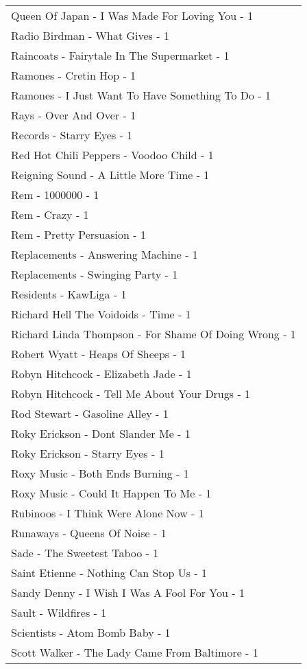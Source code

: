\documentclass[
]{article}
\begin{document}
\begin{longtable}{l}
Queen Of Japan - I Was Made For Loving You - 1 \\ 
Radio Birdman - What Gives - 1 \\ 
Raincoats - Fairytale In The Supermarket - 1 \\ 
Ramones - Cretin Hop - 1 \\ 
Ramones - I Just Want To Have Something To Do - 1 \\ 
Rays - Over And Over - 1 \\ 
Records - Starry Eyes - 1 \\ 
Red Hot Chili Peppers - Voodoo Child - 1 \\ 
Reigning Sound - A Little More Time - 1 \\ 
Rem - 1000000 - 1 \\ 
Rem - Crazy - 1 \\ 
Rem - Pretty Persuasion - 1 \\ 
Replacements - Answering Machine - 1 \\ 
Replacements - Swinging Party - 1 \\ 
Residents - KawLiga - 1 \\ 
Richard Hell The Voidoids - Time - 1 \\ 
Richard Linda Thompson - For Shame Of Doing Wrong - 1 \\ 
Robert Wyatt - Heaps Of Sheeps - 1 \\ 
Robyn Hitchcock - Elizabeth Jade - 1 \\ 
Robyn Hitchcock - Tell Me About Your Drugs - 1 \\ 
Rod Stewart - Gasoline Alley - 1 \\ 
Roky Erickson - Dont Slander Me - 1 \\ 
Roky Erickson - Starry Eyes - 1 \\ 
Roxy Music - Both Ends Burning - 1 \\ 
Roxy Music - Could It Happen To Me - 1 \\ 
Rubinoos - I Think Were Alone Now - 1 \\ 
Runaways - Queens Of Noise - 1 \\ 
Sade - The Sweetest Taboo - 1 \\ 
Saint Etienne - Nothing Can Stop Us - 1 \\ 
Sandy Denny - I Wish I Was A Fool For You - 1 \\ 
Sault - Wildfires - 1 \\ 
Scientists - Atom Bomb Baby - 1 \\ 
Scott Walker - The Lady Came From Baltimore - 1 \\ 

\end{longtable}
\end{document}

